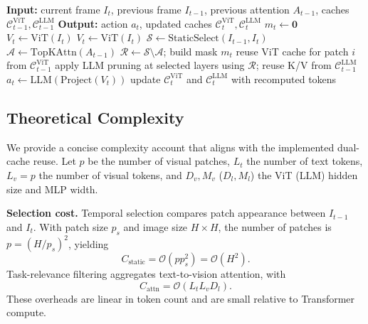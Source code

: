 \documentclass[lettersize,journal]{IEEEtran}
\begin{document}
\begin{algorithm}[t]
\caption{Coordinated Dual-Cache Inference}
\label{alg:dual_cache}
\begin{algorithmic}
\STATE \textbf{Input:} current frame $I_t$, previous frame $I_{t-1}$, previous attention $A_{t-1}$, caches $\mathcal{C}^{\text{ViT}}_{t-1}, \mathcal{C}^{\text{LLM}}_{t-1}$
\STATE \textbf{Output:} action $a_t$, updated caches $\mathcal{C}^{\text{ViT}}_{t}, \mathcal{C}^{\text{LLM}}_{t}$
    \STATE $m_t \leftarrow \mathbf{0}$ 
    \STATE $V_t \leftarrow \text{ViT}(I_t)$
\ELSE
    \STATE $V_t \leftarrow \text{ViT}(I_t)$ 
    \STATE $\mathcal{S} \leftarrow \text{StaticSelect}(I_{t-1}, I_t)$ 
    \STATE $\mathcal{A} \leftarrow \text{TopKAttn}(A_{t-1})$ 
    \STATE $\mathcal{R} \leftarrow \mathcal{S} \setminus \mathcal{A}$; build mask $m_t$
            \STATE reuse ViT cache for patch $i$ from $\mathcal{C}^{\text{ViT}}_{t-1}$
        \ENDIF
    \ENDFOR
\ENDIF
\STATE apply LLM pruning at selected layers using $\mathcal{R}$; reuse K/V from $\mathcal{C}^{\text{LLM}}_{t-1}$
\STATE $a_t \leftarrow \text{LLM}(\text{Project}(V_t))$
\STATE update $\mathcal{C}^{\text{ViT}}_{t}$ and $\mathcal{C}^{\text{LLM}}_{t}$ with recomputed tokens
\end{algorithmic}
\end{algorithm}

\subsection{Theoretical Complexity}
We provide a concise complexity account that aligns with the implemented dual-cache reuse. Let $p$ be the number of visual patches, $L_t$ the number of text tokens, $L_v=p$ the number of visual tokens, and $D_v, M_v$ ($D_l, M_l$) the ViT (LLM) hidden size and MLP width.

\textbf{Selection cost.} Temporal selection compares patch appearance between $I_{t-1}$ and $I_t$. With patch size $p_s$ and image size $H\times H$, the number of patches is $p=(H/p_s)^2$, yielding
\begin{equation}
    C_{\text{static}} = \mathcal{O}(p p_s^2) = \mathcal{O}(H^2).
    \label{eq:static_cost}
\end{equation}
Task-relevance filtering aggregates text-to-vision attention, with
\begin{equation}
    C_{\text{attn}} = \mathcal{O}(L_t L_v D_l).
    \label{eq:attn_filter}
\end{equation}
These overheads are linear in token count and are small relative to Transformer compute.
\end{document}
